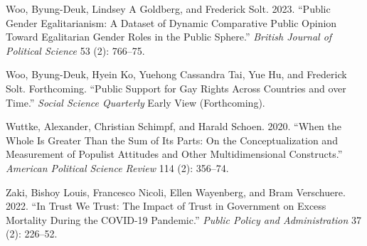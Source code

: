 \documentclass[
  12pt,
]{article}
\newlength{\cslhangindent}
\newenvironment{CSLReferences}[2] %
 {\begin{list}{}{%
  \setlength{\itemindent}{0pt}
  \setlength{\leftmargin}{0pt}
  \setlength{\parsep}{0pt}
  \ifodd #1
   \setlength{\leftmargin}{\cslhangindent}
   \setlength{\itemindent}{-1\cslhangindent}
  \fi
  \setlength{\itemsep}{#2\baselineskip}}}
 {\end{list}}
\begin{document}
\begin{CSLReferences}{1}{0}
Woo, Byung-Deuk, Lindsey A Goldberg, and Frederick Solt. 2023. {``Public Gender Egalitarianism: A Dataset of Dynamic Comparative Public Opinion Toward Egalitarian Gender Roles in the Public Sphere.''} \emph{British Journal of Political Science} 53 (2): 766--75.

Woo, Byung-Deuk, Hyein Ko, Yuehong Cassandra Tai, Yue Hu, and Frederick Solt. Forthcoming. {``Public Support for Gay Rights Across Countries and over Time.''} \emph{Social Science Quarterly} Early View (Forthcoming).

Wuttke, Alexander, Christian Schimpf, and Harald Schoen. 2020. {``When the Whole Is Greater Than the Sum of Its Parts: On the Conceptualization and Measurement of Populist Attitudes and Other Multidimensional Constructs.''} \emph{American Political Science Review} 114 (2): 356--74.

Zaki, Bishoy Louis, Francesco Nicoli, Ellen Wayenberg, and Bram Verschuere. 2022. {``In Trust We Trust: The Impact of Trust in Government on Excess Mortality During the COVID-19 Pandemic.''} \emph{Public Policy and Administration} 37 (2): 226--52.

\end{CSLReferences}

\pagebreak
\end{document}
